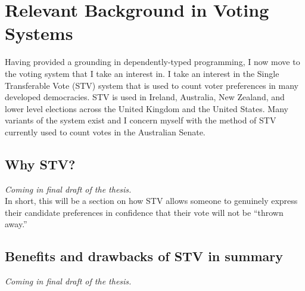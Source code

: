 \chapter{Relevant Background in Voting Systems}

Having provided a grounding in dependently-typed programming, I now move to the
voting system that I take an interest in. I take an interest in the Single
Transferable Vote (STV) system that is used to count voter preferences in many
developed democracies. STV is used in Ireland, Australia, New Zealand, and lower
level elections across the United Kingdom and the United States. Many variants
of the system exist and I concern myself with the method of STV currently used
to count votes in the Australian Senate. 

\section{Why STV?}
\textit{Coming in final draft of the thesis.} \\
In short, this will be a section on how STV allows someone to genuinely express
their candidate preferences in confidence that their vote will not be ``thrown
away.''

\section{Benefits and drawbacks of STV in summary}
\textit{Coming in final draft of the thesis.}


